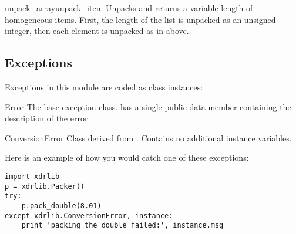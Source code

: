 \begin{funcdesc}{unpack_array}{unpack_item}
Unpacks and returns a variable length  of homogeneous items.
First, the length of the list is unpacked as an unsigned integer, then
each element is unpacked as in  above.
\end{funcdesc}

\subsection{Exceptions}

Exceptions in this module are coded as class instances:

\begin{excdesc}{Error}
The base exception class.   has a single public data
member  containing the description of the error.
\end{excdesc}

\begin{excdesc}{ConversionError}
Class derived from .  Contains no additional instance
variables.
\end{excdesc}

Here is an example of how you would catch one of these exceptions:

\bcode\begin{verbatim}
import xdrlib
p = xdrlib.Packer()
try:
    p.pack_double(8.01)
except xdrlib.ConversionError, instance:
    print 'packing the double failed:', instance.msg
\end{verbatim}\ecode
